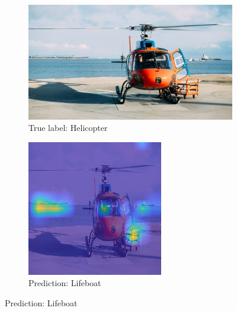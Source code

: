 \begin{figure}
     \vspace{0.5em}
     \begin{subfigure}[b]{0.30\textwidth}
         \centering
         \includegraphics[width=\textwidth]{images/chopper-1.jpeg}
         \caption{True label: Helicopter}
         \label{fig:layer-5}
     \end{subfigure}
     \hspace{1em}%
     \begin{subfigure}[b]{0.30\textwidth}
         \centering
         \includegraphics[width=\textwidth]{images/lifeboat-hm.png}
         \caption{Prediction: Lifeboat}
         \label{fig:layer-9}
     \end{subfigure}
     

\end{figure}

